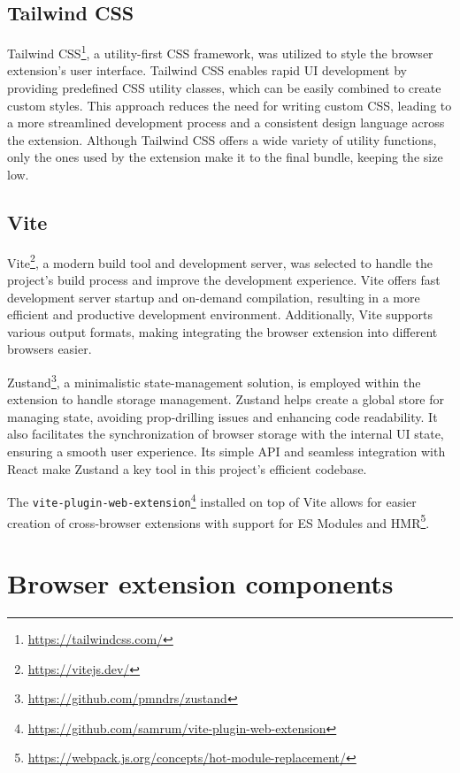\subsection{Tailwind CSS}

Tailwind CSS\footnote{\url{https://tailwindcss.com/}}, a utility-first CSS framework, was utilized to style the browser extension's user interface. Tailwind CSS enables rapid UI development by providing predefined CSS utility classes, which can be easily combined to create custom styles. This approach reduces the need for writing custom CSS, leading to a more streamlined development process and a consistent design language across the extension. Although Tailwind CSS offers a wide variety of utility functions, only the ones used by the extension make it to the final bundle, keeping the size low.

\subsection{Vite}

Vite\footnote{\url{https://vitejs.dev/}}, a modern build tool and development server, was selected to handle the project's build process and improve the development experience. Vite offers fast development server startup and on-demand compilation, resulting in a more efficient and productive development environment. Additionally, Vite supports various output formats, making integrating the browser extension into different browsers easier.



Zustand\footnote{\url{https://github.com/pmndrs/zustand}}, a minimalistic state-management solution, is employed within the extension to handle storage management. Zustand helps create a global store for managing state, avoiding prop-drilling issues and enhancing code readability. It also facilitates the synchronization of browser storage with the internal UI state, ensuring a smooth user experience. Its simple API and seamless integration with React make Zustand a key tool in this project's efficient codebase.
	
The \texttt{vite-plugin-web-extension}\footnote{\url{https://github.com/samrum/vite-plugin-web-extension}} installed on top of Vite allows for easier creation of cross-browser extensions with support for ES Modules and HMR\footnote{\url{https://webpack.js.org/concepts/hot-module-replacement/}}.

\section{Browser extension components}
\label{Section:Components}


